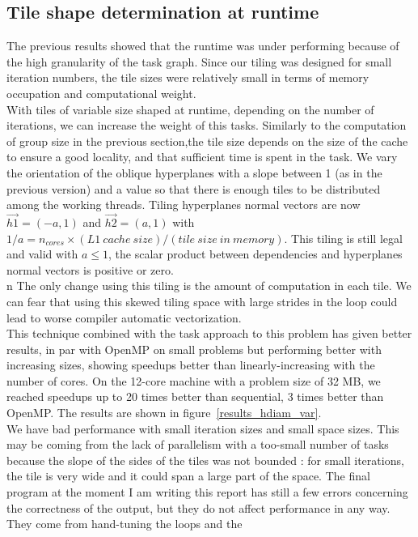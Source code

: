\documentclass[a4paper,11pt]{article}
\begin{document}
\subsection{Tile shape determination at runtime}
The previous results showed that the runtime was under performing because of the high
granularity of the task graph. Since our tiling was designed for small iteration numbers,
the tile sizes were relatively small in terms of memory occupation and computational
weight. \\
With tiles of variable size shaped at runtime, depending on the number of iterations, we
can increase the weight of this tasks. Similarly to the computation of group size in the
previous section,the tile size depends on the size of the cache to ensure a good locality, and
that sufficient time is spent in the task. We vary the orientation of the oblique hyperplanes
with a slope between 1 (as in the previous version) and a value so that there is enough tiles
to be distributed among the working threads. Tiling hyperplanes normal vectors are now 
$\vec{h1} = (−a, 1)$ and $\vec{h2} = (a, 1)$ with $1/a = n_{cores} \times (L1 \ cache \ size) / (tile \ size \ in  \ memory)$.
This tiling is still legal and valid with $a \leq 1$, the scalar product between dependencies and hyperplanes
normal vectors is positive or zero. \\n
The only change using this tiling is the amount of computation in each tile. We can
fear that using this skewed tiling space with large strides in the loop could lead to worse
compiler automatic vectorization. \\
This technique combined with the task approach to this problem has given better results, in
par with OpenMP on small problems but performing better with increasing sizes, showing
speedups better than linearly-increasing with the number of cores. On the 12-core machine
with a problem size of 32 MB, we reached speedups up to 20 times better than sequential,
3 times better than OpenMP. The results are shown in figure~\ref{results_hdiam_var}. \\
We have bad performance with small iteration sizes and small space sizes. This may be
coming from the lack of parallelism with a too-small number of tasks because the slope
of the sides of the tiles was not bounded : for small iterations, the tile is very wide
and it could span a large part of the space. The final program at the moment I am
writing this report has still a few errors concerning the correctness of the output, but they
do not affect performance in any way. They come from hand-tuning the loops and the
\end{document}
